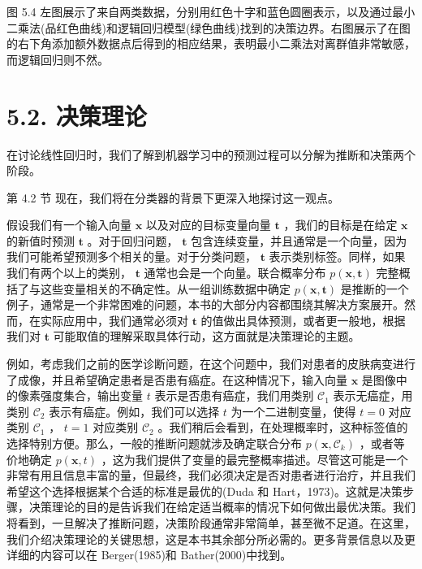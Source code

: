 \documentclass[10pt]{report}
\begin{document}
图 5.4 左图展示了来自两类数据，分别用红色十字和蓝色圆圈表示，以及通过最小二乘法(品红色曲线)和逻辑回归模型(绿色曲线)找到的决策边界。右图展示了在图的右下角添加额外数据点后得到的相应结果，表明最小二乘法对离群值非常敏感，而逻辑回归则不然。

\section*{5.2. 决策理论}

在讨论线性回归时，我们了解到机器学习中的预测过程可以分解为推断和决策两个阶段。

第 4.2 节 现在，我们将在分类器的背景下更深入地探讨这一观点。

假设我们有一个输入向量 \(\mathbf{x}\) 以及对应的目标变量向量 \(\mathbf{t}\) ，我们的目标是在给定 \(\mathbf{x}\) 的新值时预测 \(\mathbf{t}\) 。对于回归问题， \(\mathbf{t}\) 包含连续变量，并且通常是一个向量，因为我们可能希望预测多个相关的量。对于分类问题， \(\mathbf{t}\) 表示类别标签。同样，如果我们有两个以上的类别， \(\mathbf{t}\) 通常也会是一个向量。联合概率分布 \(p\left( {\mathbf{x},\mathbf{t}}\right)\) 完整概括了与这些变量相关的不确定性。从一组训练数据中确定 \(p\left( {\mathbf{x},\mathbf{t}}\right)\) 是推断的一个例子，通常是一个非常困难的问题，本书的大部分内容都围绕其解决方案展开。然而，在实际应用中，我们通常必须对 \(\mathbf{t}\) 的值做出具体预测，或者更一般地，根据我们对 \(\mathbf{t}\) 可能取值的理解采取具体行动，这方面就是决策理论的主题。

例如，考虑我们之前的医学诊断问题，在这个问题中，我们对患者的皮肤病变进行了成像，并且希望确定患者是否患有癌症。在这种情况下，输入向量 \(\mathbf{x}\) 是图像中的像素强度集合，输出变量 \(t\) 表示是否患有癌症，我们用类别 \({\mathcal{C}}_{1}\) 表示无癌症，用类别 \({\mathcal{C}}_{2}\) 表示有癌症。例如，我们可以选择 \(t\) 为一个二进制变量，使得 \(t = 0\) 对应类别 \({\mathcal{C}}_{1}\) ， \(t = 1\) 对应类别 \({\mathcal{C}}_{2}\) 。我们稍后会看到，在处理概率时，这种标签值的选择特别方便。那么，一般的推断问题就涉及确定联合分布 \(p\left( {\mathbf{x},{\mathcal{C}}_{k}}\right)\) ，或者等价地确定 \(p\left( {\mathbf{x},t}\right)\) ，这为我们提供了变量的最完整概率描述。尽管这可能是一个非常有用且信息丰富的量，但最终，我们必须决定是否对患者进行治疗，并且我们希望这个选择根据某个合适的标准是最优的(Duda 和 Hart，1973)。这就是决策步骤，决策理论的目的是告诉我们在给定适当概率的情况下如何做出最优决策。我们将看到，一旦解决了推断问题，决策阶段通常非常简单，甚至微不足道。在这里，我们介绍决策理论的关键思想，这是本书其余部分所必需的。更多背景信息以及更详细的内容可以在 Berger(1985)和 Bather(2000)中找到。
\end{document}
